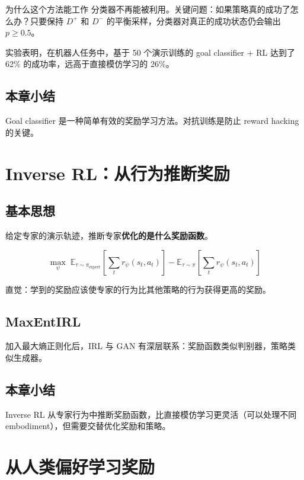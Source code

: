 \documentclass[a4paper]{article}
\begin{document}
\begin{knowledgebox}{为什么这个方法能工作}
分类器不再能被利用。关键问题：如果策略真的成功了怎么办？只要保持 $D^+$ 和 $D^-$ 的平衡采样，分类器对真正的成功状态仍会输出 $p \geq 0.5$。
\end{knowledgebox}

实验表明，在机器人任务中，基于 50 个演示训练的 goal classifier + RL 达到了 62\% 的成功率，远高于直接模仿学习的 26\%。

\subsection{本章小结}

Goal classifier 是一种简单有效的奖励学习方法。对抗训练是防止 reward hacking 的关键。

\section{Inverse RL：从行为推断奖励}

\subsection{基本思想}

给定专家的演示轨迹，推断专家\textbf{优化的是什么奖励函数}。

$$\max_\psi \; \mathbb{E}_{\tau \sim \pi_{\text{expert}}}\left[\sum_t r_\psi(s_t, a_t)\right] - \mathbb{E}_{\tau \sim \pi}\left[\sum_t r_\psi(s_t, a_t)\right]$$

直觉：学到的奖励应该使专家的行为比其他策略的行为获得更高的奖励。

\subsection{MaxEntIRL}

加入最大熵正则化后，IRL 与 GAN 有深层联系：奖励函数类似判别器，策略类似生成器。

\subsection{本章小结}

Inverse RL 从专家行为中推断奖励函数，比直接模仿学习更灵活（可以处理不同 embodiment），但需要交替优化奖励和策略。

\section{从人类偏好学习奖励}
\end{document}
